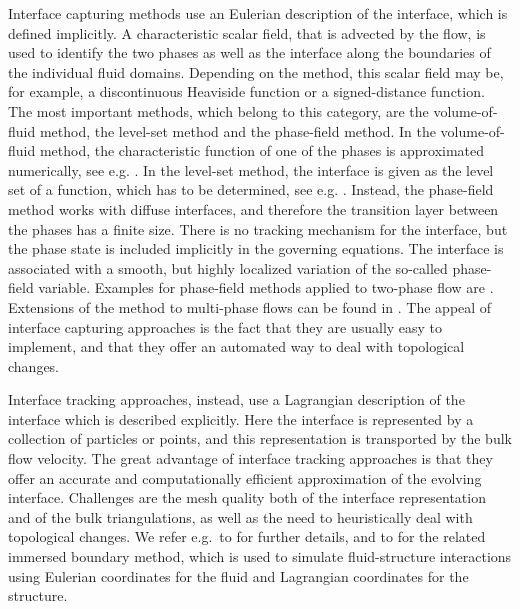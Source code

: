 \documentclass[a4paper,12pt,onecolumn]{article}
\begin{document}
Interface capturing methods use an Eulerian description of the interface, which
is defined implicitly. A characteristic scalar field,
that is advected by the flow, is used to identify
the two phases as well as the interface along the boundaries of the individual
fluid domains. Depending on the method, this scalar field may be, for example,
a discontinuous Heaviside function or a signed-distance function. The most
important methods, which belong to this category, are
the volume-of-fluid method, the level-set method and the phase-field method.
In the volume-of-fluid method, the characteristic
function of one of the phases is approximated numerically, see e.g.
\cite{HirtN81,RenardyR02,Popinet09}. In the level-set method, the interface is
given as the level set of a function, which has to be determined, see e.g.
\cite{SussmanSO94,Sethian99,OsherF03,GrossR07,GrossR11,Svacek17}. Instead, the
phase-field method works with diffuse interfaces, and therefore the transition
layer between the phases has a finite size. There is no tracking mechanism for
the interface, but the phase state is included implicitly in the governing
equations. The interface is associated with a smooth, but highly localized
variation of the so-called phase-field variable.
Examples for phase-field methods applied to two-phase flow are
\cite{HohenbergH77,AndersonMW98,LowengrubT98,Boyer02,Feng06,DingSS07,%
KaySW08,AbelsGG12,GrunK14,GarckeHK16}.
Extensions of the method to multi-phase flows
can be found in \cite{Dong14,Dong15,BoyerM14,BanasN17}.
The appeal of interface capturing approaches is the fact that they are usually
easy to implement, and that they offer an automated way to deal with
topological changes.

Interface tracking approaches, instead, use a Lagrangian description of the
interface which is described explicitly. Here the interface is represented
by a collection of particles or points, and this representation is
transported by the bulk flow velocity.
The great
advantage of interface tracking approaches is that they offer an accurate and
computationally efficient approximation of the evolving interface.
Challenges are the mesh quality both of the interface representation and of the
bulk triangulations, as well as the need to heuristically deal with topological
changes.
We refer e.g.\ to
\cite{UnverdiT92,Bansch01,Tryggvason_etal01,GanesanT08,spurious,
fluidfbp} for further details, and to \cite{LevequeL97,Peskin02} for the
related immersed boundary method, which is used to simulate fluid-structure
interactions using Eulerian coordinates for the fluid and Lagrangian
coordinates for the structure.
\end{document}
